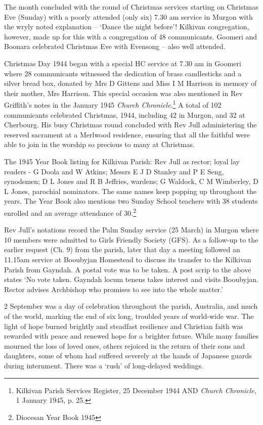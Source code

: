 The month concluded with the round of Christmas services starting on Christmas Eve (Sunday) with a poorly attended (only six) 7.30 am service in Murgon with the wryly noted explanation -- `Dance the night before'! Kilkivan congregation, however, made up for this with a congregation of 48 communicants. Goomeri and Boonara celebrated Christmas Eve with Evensong -- also well attended.



Christmas Day 1944 began with a special HC service at 7.30 am in Goomeri where 28 communicants witnessed the dedication of brass candlesticks and a silver bread box, donated by Mrs D Gittens and Miss I M Harrison in memory of their mother, Mrs Harrison. This special occasion was also mentioned in Rev Griffith's notes in the January 1945 \emph{Church Chronicle}.\footnote{Kilkivan Parish Services Register, 25 December 1944 AND \emph{Church Chronicle,} 1 January 1945, p. 25.} A total of 102 communicants celebrated Christmas, 1944, including 42 in Murgon, and 32 at Cherbourg. His busy Christmas round concluded with Rev Jull administering the reserved sacrament at a Merlwood residence, ensuring that all the faithful were able to join in the worship so precious to many at Christmas.


The 1945 Year Book listing for Kilkivan Parish: Rev Jull as rector; loyal lay readers - G Doola and W Atkins; Messrs E J D Stanley and P E Seng, synodsmen; D L Jones and R B Jeffries, wardens; G Waldock, C M Wimberley, D L Jones, parochial nominators. The same names keep popping up throughout the years. The Year Book also mentions two Sunday School teachers with 38 students enrolled and an average attendance of 30.\footnote{Diocesan Year Book 1945}


Rev Jull's notations record the Palm Sunday service (25 March) in Murgon where 10 members were admitted to Girls Friendly Society (GFS). As a follow-up to the earlier request (Ch. 9) from the parish, later that day a meeting followed an 11.15am service at Booubyjan Homestead to discuss its transfer to the Kilkivan Parish from Gayndah. A postal vote was to be taken. A post scrip to the above states `No vote taken. Gayndah locum tenens takes interest and visits Booubyjan. Rector advises Archbishop who promises to see into the whole matter.'



2 September was a day of celebration throughout the parish, Australia, and much of the world, marking the end of six long, troubled years of world-wide war. The light of hope burned brightly and steadfast resilience and Christian faith was rewarded with peace and renewed hope for a brighter future. While many families mourned the loss of loved ones, others rejoiced in the return of their sons and daughters, some of whom had suffered severely at the hands of Japanese guards during internment. There was a `rush' of long-delayed weddings.



